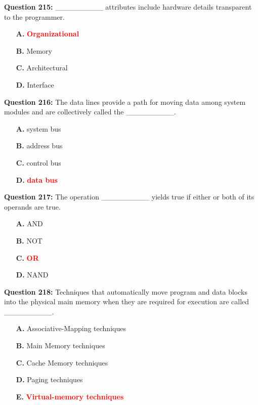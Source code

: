 \documentclass[12pt,a4paper]{article}
\begin{document}
\vspace{0.5cm}

\textbf{Question 215:} _________ attributes include hardware details transparent to the programmer.

\begin{itemize}
    \item[\textbf{A.}] \textcolor{red}{\textbf{Organizational}}
    \item[\textbf{B.}] Memory
    \item[\textbf{C.}] Architectural
    \item[\textbf{D.}] Interface
\end{itemize}

\vspace{0.5cm}

\textbf{Question 216:} The data lines provide a path for moving data among system modules and are collectively called the _________.

\begin{itemize}
    \item[\textbf{A.}] system bus
    \item[\textbf{B.}] address bus
    \item[\textbf{C.}] control bus
    \item[\textbf{D.}] \textcolor{red}{\textbf{data bus}}
\end{itemize}

\vspace{0.5cm}

\textbf{Question 217:} The operation _________ yields true if either or both of its operands are true.

\begin{itemize}
    \item[\textbf{A.}] AND
    \item[\textbf{B.}] NOT
    \item[\textbf{C.}] \textcolor{red}{\textbf{OR}}
    \item[\textbf{D.}] NAND
\end{itemize}

\vspace{0.5cm}

\textbf{Question 218:} Techniques that automatically move program and data blocks into the physical main memory when they are required for execution are called _________.

\begin{itemize}
    \item[\textbf{A.}] Associative-Mapping techniques
    \item[\textbf{B.}] Main Memory techniques
    \item[\textbf{C.}] Cache Memory techniques
    \item[\textbf{D.}] Paging techniques
    \item[\textbf{E.}] \textcolor{red}{\textbf{Virtual-memory techniques}}
\end{itemize}
\end{document}
